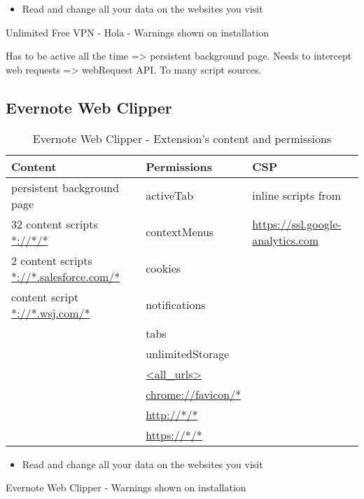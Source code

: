 \begin{listing}
	\begin{itemize}
		\item  Read and change all your data on the websites you visit
	\end{itemize}
	\caption{Unlimited Free VPN - Hola - Warnings shown on installation}
\end{listing}

Has to be active all the time => persistent background page. Needs to intercept web requests => webRequest API. 
To many script sources.

\subsection{Evernote Web Clipper}

\begin{table}[h]
	\centering
	\begin{tabular}{|l|l|l|} \hline
		\textbf{Content} & \textbf{Permissions} & \textbf{CSP} \\ \hline
		persistent background page & activeTab & inline scripts from  \\
		32 content scripts  \url{*://*/*} & contextMenus & \hspace{1em} \url{https://ssl.google-analytics.com} \\
		2 content scripts \url{*://*.salesforce.com/*} & cookies & \\ 
		content script \url{*://*.wsj.com/*} & notifications & \\ 
		& tabs & \\ 
		& unlimitedStorage & \\ 
		& \url{<all_urls>} & \\ 
		& \url{chrome://favicon/*} & \\ 
		& \url{http://*/*} & \\ 
		& \url{https://*/*} & \\ \hline
	\end{tabular}
	\caption{Evernote Web Clipper - Extension's content and permissions}
\end{table}

\begin{listing}
	\begin{itemize}
		\item  Read and change all your data on the websites you visit
	\end{itemize}
	\caption{Evernote Web Clipper - Warnings shown on installation}
\end{listing}
